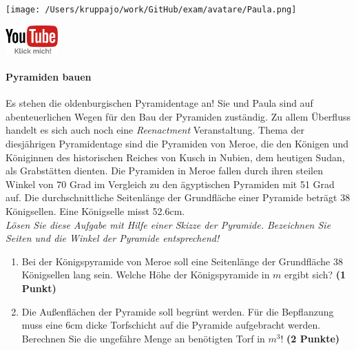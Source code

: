 \documentclass[a4paper, 9pt]{scrartcl}\usepackage[]{graphicx}\usepackage[]{xcolor}
\begin{document}
 
\ifcollection
\begin{flushright}
\tiny\vspace{-3Ex}
\textbf{\examinhaltstart}
\exammodulemathstat
\vspace{-4Ex}
\end{flushright}
\begin{minipage}[t]{0.5\textwidth}
\texttt{[image: /Users/kruppajo/work/GitHub/exam/avatare/Paula.png]}
\end{minipage}
\begin{minipage}[t]{0.5\textwidth}
\hfill
\href{https://youtu.be/tDgr6fpkkYA}{\includegraphics[width = 2cm]{img/youtube}}
\end{minipage}
\fi



\ifcollection
\paragraph{Pyramiden bauen}
\fi



Es stehen die oldenburgischen Pyramidentage an! Sie und Paula sind auf abenteuerlichen Wegen für den Bau der Pyramiden zuständig. Zu allem Überfluss handelt es sich auch noch eine \textit{Reenactment} Veranstaltung. Thema der diesjährigen Pyramidentage sind die Pyramiden von Meroe, die den Königen und Königinnen des historischen Reiches von Kusch in Nubien, dem heutigen Sudan, als Grabstätten dienten. Die Pyramiden in Meroe fallen durch ihren steilen Winkel von 70 Grad im Vergleich zu den ägyptischen Pyramiden mit 51 Grad auf. Die durchschnittliche Seitenlänge der Grundfläche einer Pyramide beträgt 38 Königsellen. Eine Königselle misst 52.6cm.\\

\textit{Lösen Sie diese Aufgabe mit Hilfe einer Skizze der Pyramide. Bezeichnen Sie Seiten und die Winkel der Pyramide entsprechend!}

\begin{enumerate}
\item Bei der Königspyramide von Meroe soll eine Seitenlänge der Grundfläche 38 Königsellen lang sein. Welche Höhe der Königspyramide in $m$ ergibt sich? \textbf{(1 Punkt)}
\item Die Außenflächen der Pyramide soll begrünt werden. Für die Bepflanzung muss eine 6cm dicke Torfschicht auf die Pyramide aufgebracht werden. Berechnen Sie die ungefähre Menge an benötigten Torf in $m^3$! \textbf{(2 Punkte)}
\end{enumerate}
\end{document}
